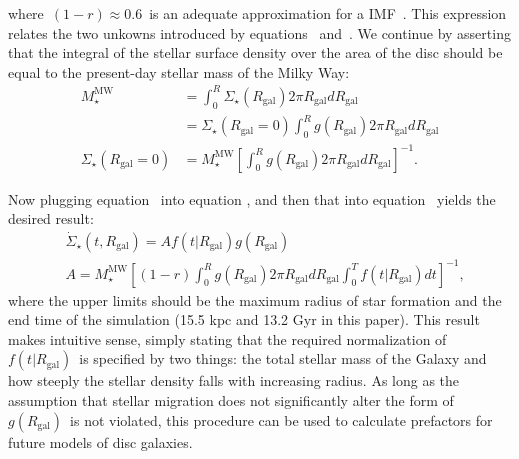 \documentclass[main.tex]{subfiles}
\begin{document}
where~$(1 - r) \approx 0.6$~is an adequate approximation for a 
\citet{Kroupa2001} IMF~\citep[][see discussion in 
their~\S~2.2]{Weinberg2017b}. 
This expression relates the two unkowns introduced by 
equations~ and~. We continue 
by asserting that the integral of the stellar surface density over the area of 
the disc should be equal to the present-day stellar mass of the Milky Way: 
\begin{subequations}\begin{align} 
M_\star^\text{MW} &= \int_0^R \Sigma_\star(R_\text{gal}) 2\pi R_\text{gal} 
dR_\text{gal} 
\\ 
&= \Sigma_\star(R_\text{gal} = 0) \int_0^R g(R_\text{gal}) 2\pi R_\text{gal} 
dR_\text{gal} 
\\ 
\Sigma_\star(R_\text{gal} = 0) &= M_\star^\text{MW} \left[\int_0^R 
g(R_\text{gal}) 2\pi R_\text{gal}dR_\text{gal}\right]^{-1}. 
\label{migration:eq:intermediate_2} 
\end{align}\end{subequations} 
\par 
Now plugging equation~ into equation 
, and then that into equation~ 
yields the desired result: 
\begin{subequations}\begin{align} 
&\dot{\Sigma}_\star(t, R_\text{gal}) = Af(t|R_\text{gal})g(R_\text{gal}) 
\\ 
&A = M_\star^\text{MW}\left[(1 - r) \int_0^R g(R_\text{gal})2\pi R_\text{gal} 
dR_\text{gal} \int_0^T f(t|R_\text{gal})dt\right]^{-1}, 
\end{align}\end{subequations} 
where the upper limits should be the maximum radius of star formation and the 
end time of the simulation (15.5 kpc and 13.2 Gyr in this paper). This result 
makes intuitive sense, simply stating that the required normalization of 
$f(t|R_\text{gal})$~is specified by two things: the total stellar mass of the 
Galaxy and how steeply the stellar density falls with increasing radius. As 
long as the assumption that stellar migration does not significantly alter the 
form of~$g(R_\text{gal})$~is not violated, this procedure can be used to 
calculate prefactors for future models of disc galaxies. 
\end{document}
